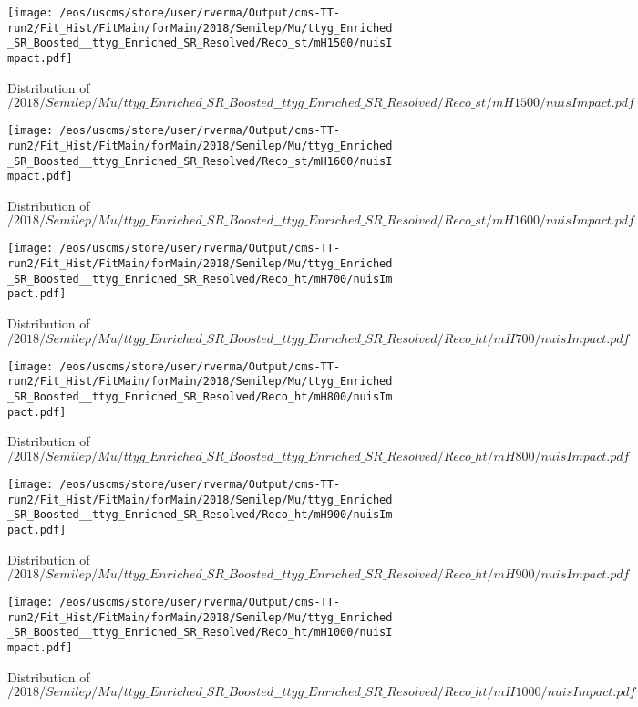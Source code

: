 \begin{figure}
\centering
\texttt{[image: /eos/uscms/store/user/rverma/Output/cms-TT-run2/Fit\_Hist/FitMain/forMain/2018/Semilep/Mu/ttyg\_Enriched\_SR\_Boosted\_\_ttyg\_Enriched\_SR\_Resolved/Reco\_st/mH1500/nuisImpact.pdf]}
\caption{Distribution of $/2018/Semilep/Mu/ttyg\_Enriched\_SR\_Boosted\_\_ttyg\_Enriched\_SR\_Resolved/Reco\_st/mH1500/nuisImpact.pdf$}
\end{figure}

\begin{figure}
\centering
\texttt{[image: /eos/uscms/store/user/rverma/Output/cms-TT-run2/Fit\_Hist/FitMain/forMain/2018/Semilep/Mu/ttyg\_Enriched\_SR\_Boosted\_\_ttyg\_Enriched\_SR\_Resolved/Reco\_st/mH1600/nuisImpact.pdf]}
\caption{Distribution of $/2018/Semilep/Mu/ttyg\_Enriched\_SR\_Boosted\_\_ttyg\_Enriched\_SR\_Resolved/Reco\_st/mH1600/nuisImpact.pdf$}
\end{figure}

\begin{figure}
\centering
\texttt{[image: /eos/uscms/store/user/rverma/Output/cms-TT-run2/Fit\_Hist/FitMain/forMain/2018/Semilep/Mu/ttyg\_Enriched\_SR\_Boosted\_\_ttyg\_Enriched\_SR\_Resolved/Reco\_ht/mH700/nuisImpact.pdf]}
\caption{Distribution of $/2018/Semilep/Mu/ttyg\_Enriched\_SR\_Boosted\_\_ttyg\_Enriched\_SR\_Resolved/Reco\_ht/mH700/nuisImpact.pdf$}
\end{figure}

\begin{figure}
\centering
\texttt{[image: /eos/uscms/store/user/rverma/Output/cms-TT-run2/Fit\_Hist/FitMain/forMain/2018/Semilep/Mu/ttyg\_Enriched\_SR\_Boosted\_\_ttyg\_Enriched\_SR\_Resolved/Reco\_ht/mH800/nuisImpact.pdf]}
\caption{Distribution of $/2018/Semilep/Mu/ttyg\_Enriched\_SR\_Boosted\_\_ttyg\_Enriched\_SR\_Resolved/Reco\_ht/mH800/nuisImpact.pdf$}
\end{figure}

\begin{figure}
\centering
\texttt{[image: /eos/uscms/store/user/rverma/Output/cms-TT-run2/Fit\_Hist/FitMain/forMain/2018/Semilep/Mu/ttyg\_Enriched\_SR\_Boosted\_\_ttyg\_Enriched\_SR\_Resolved/Reco\_ht/mH900/nuisImpact.pdf]}
\caption{Distribution of $/2018/Semilep/Mu/ttyg\_Enriched\_SR\_Boosted\_\_ttyg\_Enriched\_SR\_Resolved/Reco\_ht/mH900/nuisImpact.pdf$}
\end{figure}

\begin{figure}
\centering
\texttt{[image: /eos/uscms/store/user/rverma/Output/cms-TT-run2/Fit\_Hist/FitMain/forMain/2018/Semilep/Mu/ttyg\_Enriched\_SR\_Boosted\_\_ttyg\_Enriched\_SR\_Resolved/Reco\_ht/mH1000/nuisImpact.pdf]}
\caption{Distribution of $/2018/Semilep/Mu/ttyg\_Enriched\_SR\_Boosted\_\_ttyg\_Enriched\_SR\_Resolved/Reco\_ht/mH1000/nuisImpact.pdf$}
\end{figure}


